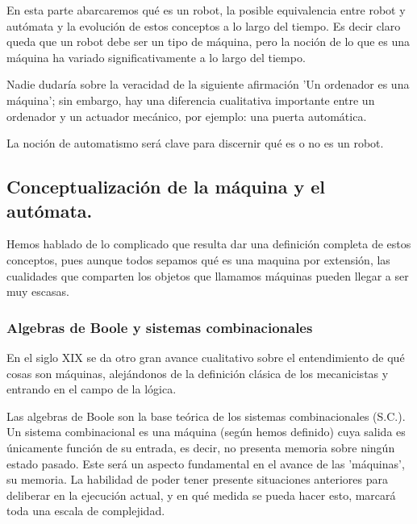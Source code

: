 


En esta parte abarcaremos qué es un robot, la posible equivalencia entre robot y autómata y la evolución de estos conceptos a lo largo del tiempo. Es decir claro queda que un robot debe ser un tipo de máquina, pero la noción de lo que es una máquina ha variado significativamente a lo largo del tiempo. 

\vspace{10px}

Nadie dudaría sobre la veracidad de la siguiente afirmación 'Un ordenador es una máquina'; sin embargo, hay una diferencia cualitativa importante entre un ordenador y un actuador mecánico, por ejemplo: una puerta automática.

\vspace{10px}

La noción de automatismo será clave para discernir qué es o no es un robot. 

\vspace{10px}





\subsection{Conceptualización de la máquina y el autómata.}

Hemos hablado de lo complicado que resulta dar una definición completa de estos conceptos, pues aunque todos sepamos qué es una maquina por extensión, las cualidades que comparten los objetos que llamamos máquinas pueden llegar a ser muy escasas.

\subsubsection{Algebras de Boole y sistemas combinacionales}

En el siglo XIX se da otro gran avance cualitativo sobre el entendimiento de qué cosas son máquinas, alejándonos de la definición clásica de los mecanicistas y entrando en el campo de la lógica.

\vspace{10px}

Las algebras de Boole son la base teórica de los sistemas combinacionales (S.C.). Un sistema combinacional es una máquina (según hemos definido) cuya salida es únicamente función de su entrada, es decir, no presenta memoria sobre ningún estado pasado. Este será un aspecto fundamental en el avance de las 'máquinas', su memoria. La habilidad de poder tener presente situaciones anteriores para deliberar en la ejecución actual, y en qué medida se pueda hacer esto, marcará toda una escala de complejidad.

